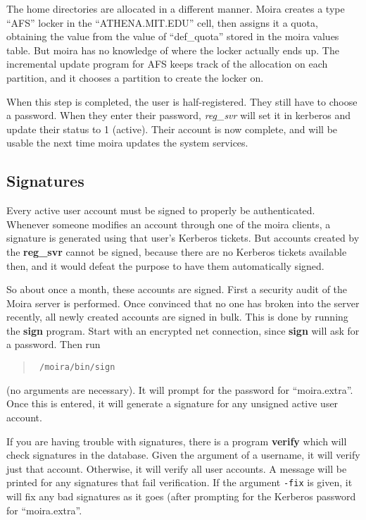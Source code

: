 The home directories are allocated in a different manner.  Moira
creates a type ``AFS'' locker in the ``ATHENA.MIT.EDU'' cell, then
assigns it a quota, obtaining the value from the value of
``def\_quota'' stored in the moira values table.  But moira has no
knowledge of where the locker actually ends up.  The incremental
update program for AFS keeps track of the allocation on each
partition, and it chooses a partition to create the locker on.

When this step is completed, the user is half-registered.  They still
have to choose a password.  When they enter their password, {\em
reg\_svr} will set it in kerberos and update their status to 1
(active).  Their account is now complete, and will be usable the next
time moira updates the system services.

\subsection{Signatures}

Every active user account must be signed to properly be authenticated.
Whenever someone modifies an account through one of the moira clients,
a signature is generated using that user's Kerberos tickets.  But
accounts created by the {\bf reg\_svr} cannot be signed, because there
are no Kerberos tickets available then, and it would defeat the
purpose to have them automatically signed.

So about once a month, these accounts are signed.  First a security
audit of the Moira server is performed.  Once convinced that no one
has broken into the server recently, all newly created accounts are
signed in bulk.  This is done by running the {\bf sign} program.
Start with an encrypted net connection, since {\bf sign} will ask for
a password.  Then run
\begin{quotation}\tt
/moira/bin/sign
\end{quotation}
(no arguments are necessary).  It will prompt for the password for
``moira.extra''.  Once this is entered, it will generate a signature
for any unsigned active user account.

If you are having trouble with signatures, there is a program {\bf
verify} which will check signatures in the database.  Given the
argument of a username, it will verify just that account.  Otherwise,
it will verify all user accounts.  A message will be printed for any
signatures that fail verification.  If the argument {\tt -fix} is
given, it will fix any bad signatures as it goes (after prompting for
the Kerberos password for ``moira.extra''.

